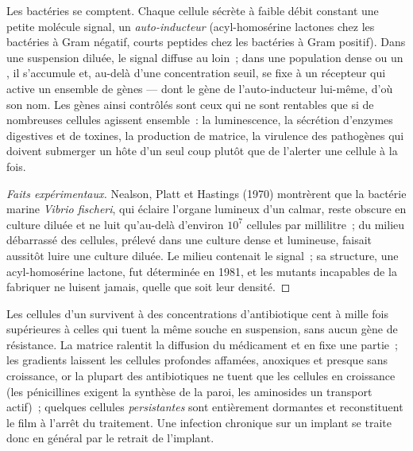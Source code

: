 \begin{proposition}\label{prop:b2:microbial-metabolism:quorum}
Les bactéries se comptent. Chaque cellule sécrète à faible débit
constant une petite molécule signal, un \emph{auto-inducteur}
(acyl-homosérine lactones chez les bactéries à Gram négatif, courts
peptides chez les bactéries à Gram positif). Dans une suspension
diluée, le signal diffuse au loin~; dans une population dense ou un
, il s'accumule et, au-delà d'une concentration seuil, se fixe à
un récepteur qui active un ensemble de gènes
--- dont le gène de l'auto-inducteur lui-même, d'où son nom.
Les gènes ainsi contrôlés sont ceux qui ne sont rentables que si de
nombreuses cellules agissent ensemble~: la luminescence, la sécrétion
d'enzymes digestives et de toxines, la production de matrice, la
virulence des pathogènes qui doivent submerger un hôte d'un seul coup
plutôt que de l'alerter une cellule à la fois.
\end{proposition}
\begin{proof}[Faits expérimentaux]
Nealson, Platt et Hastings (1970) montrèrent que la bactérie marine
\emph{Vibrio fischeri}, qui éclaire l'organe lumineux d'un calmar, reste
obscure en culture diluée et ne luit qu'au-delà d'environ $10^{7}$
cellules par millilitre~; du milieu débarrassé des cellules, prélevé
dans une culture dense et lumineuse, faisait aussitôt luire une culture
diluée. Le milieu contenait le signal~; sa structure, une acyl-homosérine
lactone, fut déterminée en 1981, et les mutants incapables de la
fabriquer ne luisent jamais, quelle que soit leur densité.
\end{proof}

\begin{example}\label{ex:b2:microbial-metabolism:tolerance}
Les cellules d'un  survivent à des concentrations d'antibiotique
cent à mille fois supérieures à celles qui tuent la même souche en
suspension, sans aucun gène de résistance. La matrice ralentit la
diffusion du médicament et en fixe une partie~; les gradients laissent
les cellules profondes affamées, anoxiques et presque sans croissance,
or la plupart des antibiotiques ne tuent que les cellules en croissance
(les pénicillines exigent la synthèse de la paroi, les aminosides un
transport actif)~; quelques cellules \emph{persistantes} sont
entièrement dormantes et reconstituent le film à l'arrêt du traitement.
Une infection chronique sur un implant se traite donc en général par le
retrait de l'implant.
\end{example}

